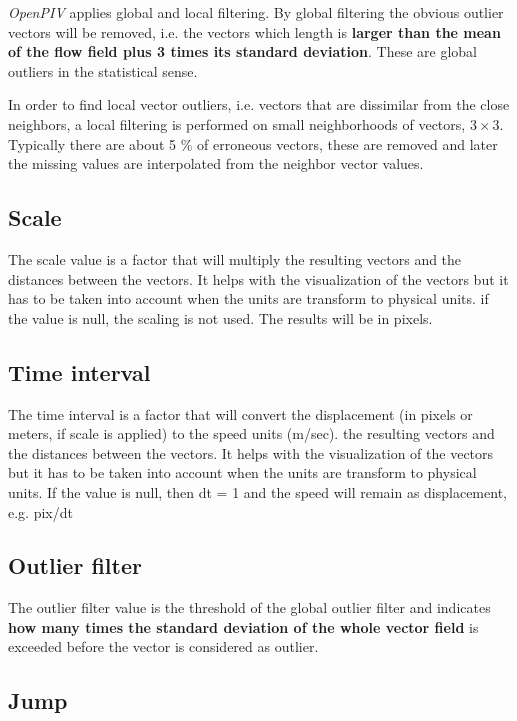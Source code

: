 \emph{OpenPIV} applies global and local filtering. By global filtering the obvious outlier vectors 
will be  removed, i.e. the vectors which length is \textbf{larger than the mean of the flow 
field plus 3 times its standard deviation}. These are global outliers in the statistical sense. 


In order to find local vector outliers, i.e. vectors that are dissimilar from the close neighbors, 
a local filtering is performed on small neighborhoods of vectors, $3 \times 3$. Typically 
there are about 5 \% of erroneous vectors, these are removed and later the missing 
values are interpolated from the neighbor vector values. 

\subsection{Scale}\label{Scale}

The scale value is a factor that will multiply the resulting vectors and the distances between the vectors. It helps with the  visualization of the vectors but it has to be taken into account when the units are transform  to physical units. if the value is null, the scaling is not used. The results will be in pixels. 

\subsection{Time interval}\label{dt}

The time interval is a factor that will convert the displacement (in pixels or meters, if scale is applied) to the speed units (m/sec). the resulting vectors and the distances between the vectors. It helps with the  visualization of the vectors but it has to be taken into account when the units are transform  to physical units. If the value is null, then dt = 1 and the speed will remain as displacement, e.g. pix/dt

\subsection{Outlier filter}\label{Outlier}

The outlier filter value is the threshold of the global outlier filter and indicates \textbf{how many times  the standard deviation of the whole vector field} is exceeded before the vector is considered as  outlier.

\subsection{Jump}\label{Jump}

